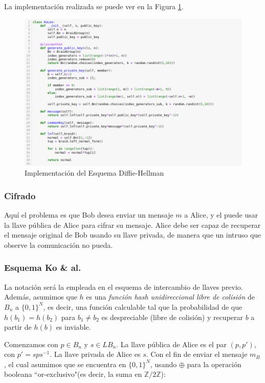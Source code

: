 \documentclass[12pt]{article}
\theoremstyle{definition}
\begin{document}
La implementación realizada se puede ver en la Figura \ref{img:imp_ko}.

\begin{figure}
\includegraphics[scale=0.5]{imgs/KoLee.png}
\caption{Implementación del Esquema Diffie-Hellman}
\label{img:imp_ko}
\end{figure}

\subsubsection{Cifrado}
Aquí el problema es que Bob desea enviar un mensaje $m$ a Alice, y el puede usar la llave pública de Alice para cifrar su mensaje. Alice debe ser capaz de recuperar el mensaje original de Bob usando su llave privada, de manera que un intruso que observe la comunicación no pueda.

\subsubsection*{Esquema Ko \& al.}
La notación será la empleada en el esquema de intercambio de llaves previo. Además, asumimos que $h$ es una \textit{función hash unidireccional libre de colisión} de $B_n$ a $\{0,1\}^N$, es decir, una función calculable tal que la probabilidad de que $h(b_1)=h(b_2)$ para $b_1\neq b_2$ es despreciable (libre de colisión) y recuperar $b$ a partir de $h(b)$ es inviable.

Comenzamos con $p\in B_n$ y $s\in LB_n$. La llave pública de Alice es el par $(p,p')$, con $p'=sps^{-1}$. La llave privada de Alice es $s$. Con el fin de enviar el mensaje $m_B$, el cual asumimos que se encuentra en $\{0,1\}^N$, usando $\oplus$ para la operación booleana ``or-exclusivo"(es decir, la suma en $\mathbb{Z}/2\mathbb{Z}$):
\end{document}
